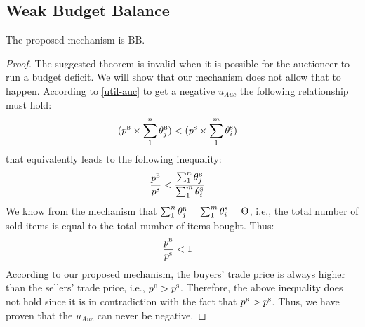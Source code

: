 \subsection{Weak Budget Balance}
\begin{Theorem}
The proposed mechanism is \acf{BB}.
\end{Theorem}
\begin{proof}
The suggested theorem is invalid when it is possible for the auctioneer to run a budget deficit. We will show that our mechanism does not allow that to happen.
According to \autoref{util-auc} to get a negative $u_{Auc}$ the following relationship must hold:
\begin{align*}
(p^\textsc{b} \times \sum_{1}^n {\theta_{j}^\textsc{b}}) &< (p^\textsc{s} \times \sum_{1}^m {\theta_{i}^\textsc{s}})
\end{align*}
that equivalently leads to the following inequality:
\begin{align*}
\frac{p^\textsc{b}}{p^\textsc{s}} &< \frac{\sum_{1}^n {\theta_{j}^\textsc{b}}}{\sum_{1}^m {\theta_{i}^\textsc{s}}}
\end{align*}
We know from the mechanism that $\sum_{1}^n {\theta_{j}^\textsc{b}}=\sum_{1}^m {\theta_{i}^\textsc{s}}=\Theta$, i.e., the total number of sold items is equal to the total number of items bought. Thus:
\begin{align*}
\frac{p^\textsc{b}}{p^\textsc{s}} &< 1 \qedhere
\end{align*}
According to our proposed mechanism, the buyers' trade price is always higher than the sellers' trade price, i.e., ${p^\textsc{b}}>{p^\textsc{s}}$. Therefore, the above inequality does not hold since it is in contradiction with the fact that ${p^\textsc{b}}>{p^\textsc{s}}$. Thus, we have proven that the $u_{Auc}$ can never be negative.
\end{proof}

